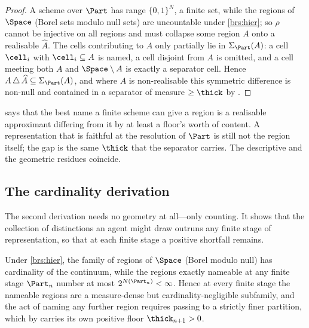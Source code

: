 \begin{proof}
A scheme over $\Part$ has range $\{0,1\}^N$, a finite set, while the regions of
$\Space$ (Borel sets modulo null sets) are uncountable under \ref{brs:hier}; so
$\rho$ cannot be injective on all regions and must collapse some region $A$ onto
a realisable $\widehat A$. The cells contributing to $A$ only partially lie in
$\Sigma_\Part(A)$: a cell $\cell_i$ with $\cell_i\subseteq A$ is named, a cell
disjoint from $A$ is omitted, and a cell meeting both $A$ and $\Space\setminus A$
is exactly a separator cell. Hence $A\,\triangle\,\widehat A\subseteq
\Sigma_\Part(A)$, and where $A$ is non-realisable this symmetric difference is
non-null and contained in a separator of measure $\ge\thick$ by
.
\end{proof}

\begin{remark}
\label{rem:faithful}
 says that the best name a finite scheme can give a region
is a realisable approximant differing from it by at least a floor's worth of
content. A representation that is faithful at the resolution of $\Part$ is still
not the region itself; the gap is the same $\thick$ that the separator carries.
The descriptive and the geometric residues coincide.
\end{remark}

\subsection{The cardinality derivation}

The second derivation needs no geometry at all---only counting. It shows that the
collection of distinctions an agent might draw outruns any finite stage of
representation, so that at each finite stage a positive shortfall remains.

\begin{proposition}
\label{prop:card}
Under \ref{brs:hier}, the family of regions of $\Space$ \textup{(}Borel modulo
null\textup{)} has cardinality of the continuum, while the regions exactly
nameable at any finite stage $\Part_n$ number at most $2^{N(\Part_n)}<\infty$.
Hence at every finite stage the nameable regions are a measure-dense but
cardinality-negligible subfamily, and the act of naming any further region
requires passing to a strictly finer partition, which by 
carries its own positive floor $\thick_{n+1}>0$.
\end{proposition}

